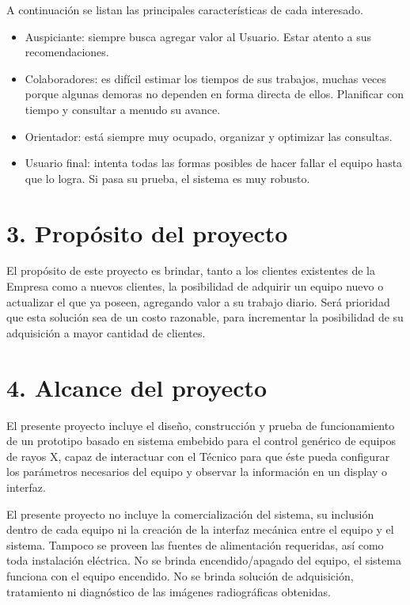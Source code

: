 \documentclass[
11pt, %
]{charter}
\begin{document}

A continuación se listan las principales características de cada interesado.
\begin{itemize}
	\item Auspiciante: siempre busca agregar valor al Usuario. Estar atento a sus recomendaciones.
	\item Colaboradores: es difícil estimar los tiempos de sus trabajos, muchas veces porque algunas demoras no dependen en forma directa de ellos. Planificar con tiempo y consultar a menudo su avance.
	\item Orientador: está siempre muy ocupado, organizar y optimizar las consultas.
	\item Usuario final: intenta todas las formas posibles de hacer fallar el equipo hasta que lo logra. Si pasa su prueba, el sistema es muy robusto.
\end{itemize}


\newpage
\section{3. Propósito del proyecto}
\label{sec:proposito}

El propósito de este proyecto es brindar, tanto a los clientes existentes de la Empresa como a nuevos clientes, la posibilidad de adquirir un equipo nuevo o actualizar el que ya poseen, agregando valor a su trabajo diario. Será prioridad que esta solución sea de un costo razonable, para incrementar la posibilidad de su adquisición a mayor cantidad de clientes. 

\section{4. Alcance del proyecto}
\label{sec:alcance}

El presente proyecto incluye el diseño, construcción y prueba de funcionamiento de un prototipo basado en sistema embebido para el control genérico de equipos de rayos X, capaz de interactuar con el Técnico para que éste pueda configurar los parámetros necesarios del equipo y observar la información en un display o interfaz. 

El presente proyecto no incluye la comercialización del sistema, su inclusión dentro de cada equipo ni la creación de la interfaz mecánica entre el equipo y el sistema. Tampoco se proveen las fuentes de alimentación requeridas, así como toda instalación eléctrica. No se brinda encendido/apagado del equipo, el sistema funciona con el equipo encendido. No se brinda solución de adquisición, tratamiento ni diagnóstico de las imágenes radiográficas obtenidas.
\end{document}
